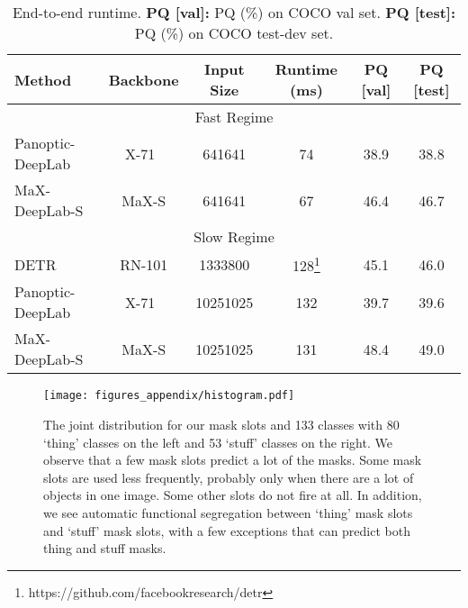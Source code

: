 \begin{savenotes}
\begin{table*}[t]
    \setlength{\tabcolsep}{1.0em}
        \begin{center}
        \begin{tabular}{l|c|c|c|c|c}
            \toprule[0.2em]
            Method & Backbone & Input Size & Runtime (ms) & PQ [val] & PQ [test] \\
            \toprule[0.2em]
            \multicolumn{6}{c}{Fast Regime}\\
            \midrule
            Panoptic-DeepLab~\cite{cheng2019panoptic} & X-71~\cite{chollet2016xception} & 641641 & 74 & 38.9 & 38.8 \\
            MaX-DeepLab-S & MaX-S & 641641 & 67 & 46.4 & 46.7 \\
            \midrule
            \multicolumn{6}{c}{Slow Regime}\\
            \midrule
            DETR~\cite{carion2020end} & RN-101 & 1333800 & 128\footnote{https://github.com/facebookresearch/detr} & 45.1 & 46.0 \\
            Panoptic-DeepLab~\cite{cheng2019panoptic} & X-71~\cite{chollet2016xception} & 10251025 & 132 & 39.7 & 39.6 \\
            MaX-DeepLab-S & MaX-S & 10251025 & 131 & 48.4 & 49.0 \\
            \bottomrule[0.1em]
        \end{tabular}
        \end{center}
        \vspace{\abovetabcapmargin}
        \caption{End-to-end runtime. {\bf PQ [val]:} PQ (\%) on COCO val set. {\bf PQ [test]:} PQ (\%) on COCO test-dev set.
        }
        \label{tab:runtime}
        \vspace{\belowtabcapmargin}
    \end{table*}
    \end{savenotes}

\begin{figure*}[t]
    \centering
    \texttt{[image: figures\_appendix/histogram.pdf]}
    \caption{The joint distribution for our  mask slots and 133 classes with 80 `thing' classes on the left and 53 `stuff' classes on the right. We observe that a few mask slots predict a lot of the masks. Some mask slots are used less frequently, probably only when there are a lot of objects in one image. Some other slots do not fire at all. In addition, we see automatic functional segregation between `thing' mask slots and `stuff' mask slots, with a few exceptions that can predict both thing and stuff masks.
    }
    \label{fig:distribution}
\end{figure*}

